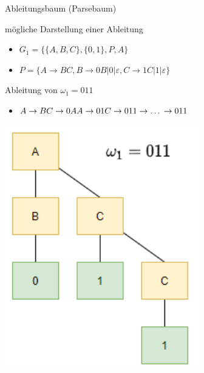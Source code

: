 \begin{minipage}{0.7\linewidth}
    \begin{definition}{Ableitungsbaum (Parsebaum)} 
        
        mögliche Darstellung einer Ableitung
        \begin{itemize}
        \item $G_{1}=\{\{A, B, C\},\{0,1\}, P, A\}$
        \item $P=\{A \rightarrow B C, B \rightarrow 0 B|0| \varepsilon, C \rightarrow 1 C|1| \varepsilon\}$
        \end{itemize}
        \vspace*{2mm}
    
        Ableitung von $\omega_{1}=011$
    
        \begin{itemize}
        \item $A \rightarrow B C \rightarrow 0 A A \rightarrow 01 C \rightarrow 011 \rightarrow \ldots \\ \rightarrow 011$
        \end{itemize}
    \end{definition}
\end{minipage}
\begin{minipage}{0.25\linewidth}
    \includegraphics[width=0.9\linewidth]{ableitungsbaum.png}
\end{minipage}



